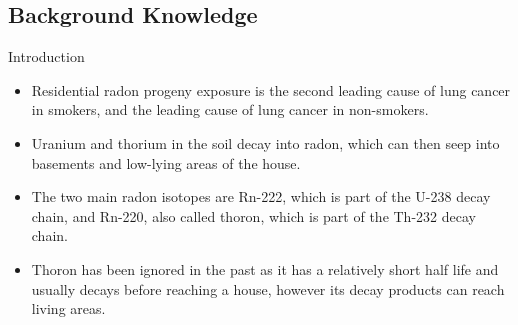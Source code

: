 \documentclass{beamer}
\begin{document}
\subsection{Background Knowledge}
\begin{frame}{Introduction}
\begin{itemize}
    \item Residential radon progeny exposure is the second leading cause of lung cancer in smokers, and the leading cause of lung cancer in non-smokers.
    \item Uranium and thorium in the soil decay into radon, which can then seep into basements and low-lying areas of the house.
    \item The two main radon isotopes are Rn-222, which is part of the U-238 decay chain, and Rn-220, also called thoron, which is part of the Th-232 decay chain.
     
\item Thoron has been ignored in the past as it has a relatively short half life and usually decays before reaching a house, however its decay products can reach living areas.
\end{itemize}
\end{frame}
\end{document}
